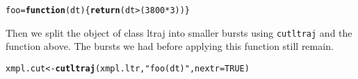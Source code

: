 \documentclass{article}\usepackage[]{graphicx}\usepackage[]{color}
\makeatletter
\newcommand{\hlnum}[1]{\textcolor[rgb]{0.686,0.059,0.569}{#1}}%
\newcommand{\hlstr}[1]{\textcolor[rgb]{0.192,0.494,0.8}{#1}}%
\newcommand{\hlopt}[1]{\textcolor[rgb]{0,0,0}{#1}}%
\newcommand{\hlstd}[1]{\textcolor[rgb]{0.345,0.345,0.345}{#1}}%
\newcommand{\hlkwa}[1]{\textcolor[rgb]{0.161,0.373,0.58}{\textbf{#1}}}%
\newcommand{\hlkwb}[1]{\textcolor[rgb]{0.69,0.353,0.396}{#1}}%
\newcommand{\hlkwc}[1]{\textcolor[rgb]{0.333,0.667,0.333}{#1}}%
\newcommand{\hlkwd}[1]{\textcolor[rgb]{0.737,0.353,0.396}{\textbf{#1}}}%
\newenvironment{kframe}{%
 \def\at@end@of@kframe{}%
 \ifinner\ifhmode%
  \def\at@end@of@kframe{\end{minipage}}%
  \begin{minipage}{\columnwidth}%
 \fi\fi%
 \def\FrameCommand##1{\hskip\@totalleftmargin \hskip-\fboxsep
 \colorbox{shadecolor}{##1}\hskip-\fboxsep
     \hskip-\linewidth \hskip-\@totalleftmargin \hskip\columnwidth}%
 \MakeFramed {\advance\hsize-\width
   \@totalleftmargin\z@ \linewidth\hsize
   \@setminipage}}%
 {\par\unskip\endMakeFramed%
 \at@end@of@kframe}
\newenvironment{knitrout}{}{} %
\makeatother
\begin{document}
\begin{knitrout}
\color{fgcolor}\begin{kframe}
\begin{alltt}
\hlstd{foo} \hlkwb{=} \hlkwa{function}\hlstd{(}\hlkwc{dt}\hlstd{) \{}\hlkwd{return}\hlstd{(dt}\hlopt{>} \hlstd{(}\hlnum{3800}\hlopt{*}\hlnum{3}\hlstd{))\}}
\end{alltt}
\end{kframe}
\end{knitrout}

Then we split the object of class ltraj into smaller bursts using \texttt{cutltraj} and the function above. The bursts we had before applying this function still remain.

\begin{knitrout}
\color{fgcolor}\begin{kframe}
\begin{alltt}
\hlstd{xmpl.cut} \hlkwb{<-} \hlkwd{cutltraj}\hlstd{(xmpl.ltr,} \hlstr{"foo(dt)"}\hlstd{,} \hlkwc{nextr} \hlstd{=} \hlnum{TRUE}\hlstd{)}
\end{alltt}
\end{kframe}
\end{knitrout}
\end{document}
